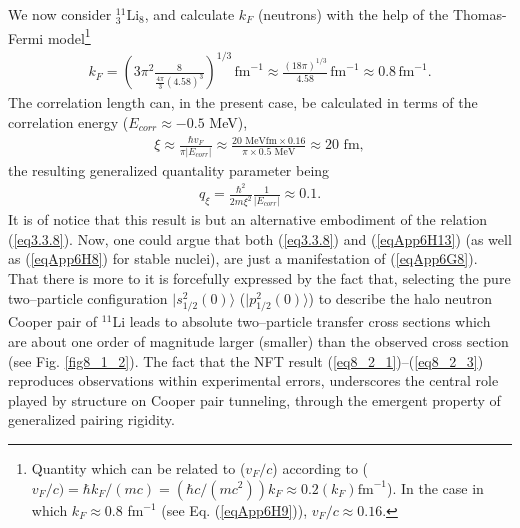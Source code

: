 \begin{subappendices}
We now consider $^{11}_3$Li$_8$, and calculate $k_F$ (neutrons) with the help of the Thomas-Fermi model\footnote{\label{fnC655} Quantity which can be related to ($v_F/c$) according to   ($v_F/c)=\hbar k_F/(mc)=(\hbar c/(mc^2))k_F\approx0.2(k_F)\text{fm}^{-1}$). In the case in which $k_F\approx 0.8 $ fm$^{-1}$ (see Eq. (\ref{eqApp6H9})),  $v_F/c\approx 0.16$. }
\begin{align}\label{eqApp6H9}
k_F=\left(3\pi^2\frac{8}{\frac{4\pi}{3}(4.58)^3}\right)^{1/3}\,\text{fm}^{-1}\approx\frac{(18\pi)^{1/3}}{4.58}\,\text{fm}^{-1}\approx 0.8\,\text{fm}^{-1}.
\end{align} 
The correlation length can, in the present case, be calculated in terms of the correlation energy ($E_{corr}\approx-0.5$ MeV), 
\begin{align}
\xi\approx \frac{\hbar v_F}{\pi|E_{corr}|}\approx \frac{20 \text{ MeVfm}\times0.16}{\pi\times 0.5\text{ MeV}}\approx 20\text{ fm},
\end{align}
 the resulting generalized quantality parameter being
\begin{align}\label{eqApp6H13}
q_\xi=\frac{\hbar^2}{2m\xi^2}\frac{1}{|E_{corr}|}\approx 0.1.
\end{align}
It is of notice that this result is but an alternative embodiment of the relation (\ref{eq3.3.8}). Now, one could argue that both (\ref{eq3.3.8}) and (\ref{eqApp6H13}) (as well as (\ref{eqApp6H8}) for stable nuclei), are just a manifestation of (\ref{eqApp6G8}). That there is more to it is forcefully expressed by the fact that, selecting the pure two--particle configuration $|s_{1/2}^2(0)\rangle$ ($|p_{1/2}^2(0)\rangle$) to describe the halo neutron Cooper pair of $^{11}$Li leads to absolute two--particle transfer cross sections which are about one order of magnitude larger (smaller) than the observed cross section (see Fig. \ref{fig8_1_2}). The fact that the NFT result (\ref{eq8_2_1})--(\ref{eq8_2_3}) reproduces observations within experimental errors, underscores the central role played by structure on Cooper pair tunneling, through the emergent property of generalized pairing rigidity.

\end{subappendices}
